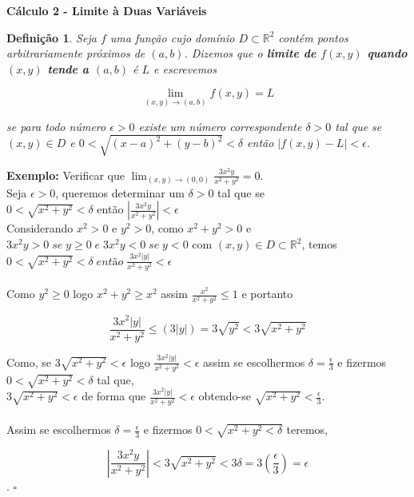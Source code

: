 \documentclass[a4,12pt]{paper}
\newtheorem{definition}{Definição}
\begin{document}
\textbf{Cálculo 2 - Limite à Duas Variáveis}

\begin{definition}
	Seja $f$ uma função cujo domínio $D\subset \mathbb{R}^2$  contém pontos arbitrariamente próximos de $(a,b)$. Dizemos que o \textbf{limite de $f(x,y)$ quando $(x, y)$ tende a $(a, b)$} é $L$ e escrevemos
	
	$$ \lim_{(x,y) \to (a,b)} f(x,y) = L $$
	
	se para todo número $\epsilon > 0$ existe um número correspondente $\delta > 0$ tal que se $(x, y) \in D$ e $ 0 < \sqrt{(x-a)^2 + (y - b)^2} < \delta $ então $ |f(x, y) - L| < \epsilon $. \\
	
\end{definition}

\textbf{Exemplo:} Verificar que $\lim_{(x,y) \to (0,0)} \frac{3x^2y}{x^2 + y^2} = 0$. \\ 

Seja $ \epsilon > 0$, queremos determinar um $\delta > 0$ tal que se \\ 


$0 < \sqrt{x^2+y^2} < \delta$ então $ |\frac{3x^2y}{x^2+y^2}| < \epsilon$ \\


Considerando $x^2 > 0$ e $y^2 > 0$, como $x^2+y^2 > 0$ e $3x^2y>0 \; se \; y\geq 0 \; e \; 3x^2y < 0 \; se \; y < 0$ com $(x, y) \in D \subset \mathbb{R}^2$,  temos \\

$ 0 < \sqrt{x^2 + y^2} < \delta \; então \; \frac{3x^2|y|}{x^2+y^2} < \epsilon  $ \\ \\

Como $ y^2 \geq 0$ logo $x^2+ y^2 \geq x^2$ assim $ \frac{x^2}{x^2+y^2} \leq 1 $ e portanto

$$ \frac{3x^2|y|}{x^2+y^2} \leq (3|y|) = 3\sqrt{y^2} < 3\sqrt{x^2+ y^2} $$


Como, se $3\sqrt{x^2 + y^2} < \epsilon$ logo $ \frac{3x^2|y|}{x^2+y^2} < \epsilon$ assim se escolhermos $\delta = \frac{\epsilon}{3}$ e fizermos $0 < \sqrt{x^2+y^2} < \delta $ tal que, \\

$ 3\sqrt{x^2+y^2} < \epsilon  $ de forma que $ \frac{3x^2|y|}{x^2+y^2} < \epsilon $ obtendo-se $ \sqrt{x^2 + y^2} < \frac{\epsilon}{3}$. \\ \\

Assim se escolhermos $ \delta = \frac{\epsilon}{3}$ e fizermos $ 0 < \sqrt{x^2+ y^2 < \delta} $ teremos,

$$ |\frac{3x^2y}{x^2+y^2}| < 3\sqrt{x^2+y^2} < 3 \delta = 3(\frac{\epsilon}{3}) = \epsilon $$.
\hspace{320pt} \textit{$\square$}
\end{document}
